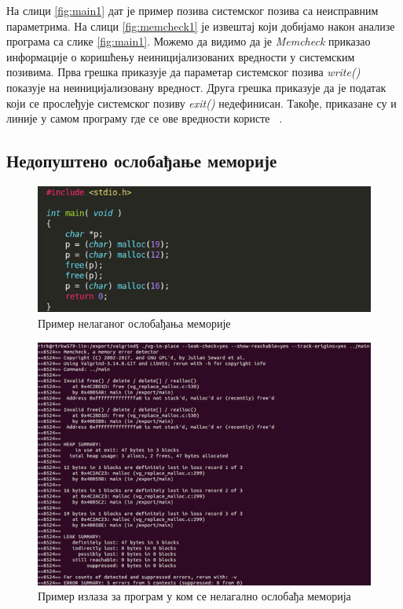 \documentclass[12pt,oneside]{memoir}
\begin{document}
\indent На слици \ref{fig:main1} дат је пример позива системског позива са неисправним параметрима. На слици \ref{fig:memcheck1} је извештај који добијамо након анализе програма са слике \ref{fig:main1}. Можемо да видимо да је \textit{Memcheck} приказао информације о коришћењу неиницијализованих вредности у системским позивима. Прва грешка приказује да параметар системског позива \textit{write()} показује на неиницијализовану вредност. Друга грешка приказује да је податак који се прослеђује системског позиву \textit{exit()} недефинисан. Такође, приказане су и линије у самом програму где се ове вредности користе ~\cite{memcheckRef}.

\subsection{Недопуштено ослобађање меморије}

\begin{figure}[h!]
\begin{center}
\includegraphics[scale=0.75]{slika5.png}
\end{center}
\caption{Пример нелаганог ослобађања меморије}
\label{fig:main2}
\end{figure}

\begin{figure}[h!]
\begin{center}
\includegraphics[scale=0.75]{slika6.png}
\end{center}
\caption{Пример излаза за програм у ком се нелагално ослобађа меморија}
\label{fig:memcheck2}
\end{figure}
\end{document}
